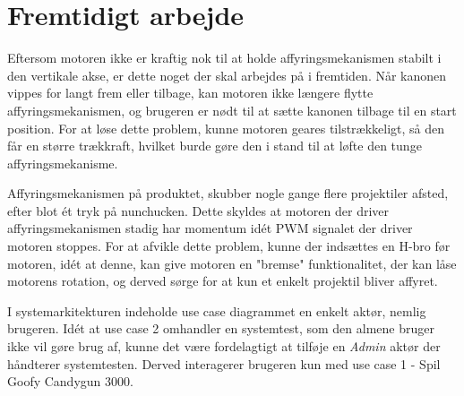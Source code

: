 \chapter{Fremtidigt arbejde}




Eftersom motoren ikke er kraftig nok til at holde affyringsmekanismen stabilt i den vertikale akse, er dette noget der skal arbejdes på i fremtiden. Når kanonen vippes for langt frem eller tilbage, kan motoren ikke længere flytte affyringsmekanismen, og brugeren er nødt til at sætte kanonen tilbage til en start position. For at løse dette problem, kunne motoren geares tilstrækkeligt, så den får en større trækkraft, hvilket burde gøre den i stand til at løfte den tunge affyringsmekanisme. \newline

\noindent Affyringsmekanismen på produktet, skubber nogle gange flere projektiler afsted, efter blot ét tryk på nunchucken. Dette skyldes at motoren der driver affyringsmekanismen stadig har momentum idét PWM signalet der driver motoren stoppes. For at afvikle dette problem, kunne der indsættes en H-bro før motoren, idét at denne, kan give motoren en "bremse" funktionalitet, der kan låse motorens rotation, og derved sørge for at kun et enkelt projektil bliver affyret. \newline 

\noindent I systemarkitekturen indeholde use case diagrammet en enkelt aktør, nemlig brugeren. Idét at use case 2 omhandler en systemtest, som den almene bruger ikke vil gøre brug af, kunne det være fordelagtigt at tilføje en \textit{Admin} aktør der håndterer systemtesten. Derved interagerer brugeren kun med use case 1 - Spil Goofy Candygun 3000. \newline

